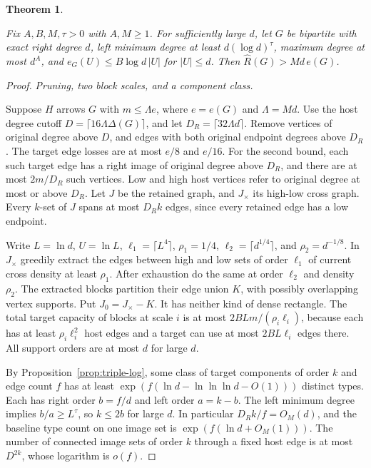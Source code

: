 \documentclass[11pt]{amsart}
\newtheorem{theorem}{Theorem}[section]
\theoremstyle{definition}
\theoremstyle{remark}
\numberwithin{equation}{section}
\begin{document}
\begin{theorem}\label{thm:incidence}

Fix $A,B,M,\tau>0$ with $ A,M\ge1$. For sufficiently large $ d $, let $ G $ be bipartite with exact right degree $ d $, left minimum degree at least $ d(\log d)^\tau $, maximum degree at most $ d^A $, and $ e_G(U)\le B\log d\,|U|$ for $|U|\le d $. Then $\widehat R(G)>Md\,e(G)$.

\end{theorem}

\begin{proof}

\medskip\noindent\emph{Pruning, two block scales, and a component class.}

Suppose $H $ arrows $ G $ with $ m\le\Lambda e $, where $ e=e(G)$ and $\Lambda=Md $. Use the host degree cutoff $ D=\lceil16\Lambda\Delta(G)\rceil $, and let $ D_R=\lceil32\Lambda d\rceil $. Remove vertices of original degree above $ D $, and edges with both original endpoint degrees above $ D_R $. The target edge losses are at most $ e/8$ and $ e/16$. For the second bound, each such target edge has a right image of original degree above $ D_R $, and there are at most $2m/D_R $ such vertices. Low and high host vertices refer to original degree at most or above $ D_R $. Let $ J $ be the retained graph, and $ J_\times $ its high-low cross graph. Every $ k $-set of $ J $ spans at most $ D_Rk$ edges, since every retained edge has a low endpoint.

Write $L=\ln d $, $ U=\ln L $, $\ell_1=\lceil L^4\rceil $, $\rho_1=1/4$, $\ell_2=\lceil d^{1/4}\rceil $, and $\rho_2=d^{-1/8}$. In $ J_\times $ greedily extract the edges between high and low sets of order $\ell_1$ of current cross density at least $\rho_1$. After exhaustion do the same at order $\ell_2$ and density $\rho_2$. The extracted blocks partition their edge union $ K $, with possibly overlapping vertex supports. Put $ J_0=J_\times-K $. It has neither kind of dense rectangle. The total target capacity of blocks at scale $ i $ is at most $2BLm/(\rho_i\ell_i)$, because each has at least $\rho_i\ell_i^2$ host edges and a target can use at most $2BL\ell_i $ edges there. All support orders are at most $ d $ for large $ d$.

By Proposition~\ref{prop:triple-log}, some class of target components of order $k $ and edge count $ f $ has at least $\exp(f(\ln d-\ln\ln\ln d-O(1)))$ distinct types. Each has right order $ b=f/d $ and left order $ a=k-b $. The left minimum degree implies $ b/a\ge L^\tau $, so $ k\le2b $ for large $ d $. In particular $ D_R k/f=O_M(d)$, and the baseline type count on one image set is $\exp(f(\ln d+O_M(1)))$. The number of connected image sets of order $ k $ through a fixed host edge is at most $ D^{2k}$, whose logarithm is $ o(f)$.


\end{proof}
\end{document}
